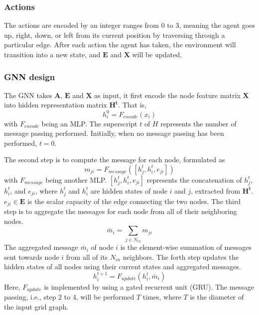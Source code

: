 \documentclass[letterpaper]{article}
\begin{document}
\subsubsection{Actions}
The actions are encoded by an integer ranges from 0 to 3, meaning the agent goes up, right, down, or left from its current position by traversing through a particular edge. After each action the agent has taken, the environment will transition into a new state, and $\mathbf{E}$ and $\mathbf{X}$ will be updated.

\subsubsection{GNN design}
The GNN takes $\mathbf{A}$, $\mathbf{E}$ and $\mathbf{X}$ as input, it first encode the node feature matrix $\mathbf{X}$ into hidden representation matrix $\mathbf{H^t}$. That is,
\begin{equation}
    h_i^0 = F_{encode}(x_i)
\end{equation}
with $F_{encode}$ being an MLP. The superscript $t$ of $H$ represents the number of message passing performed. Initially, when no message passing has been performed, $t=0$. 

The second step is to compute the message for each node, formulated as 
\begin{equation}
    m_{ji} = F_{message}([h_j^t, h_i^t, e_{ji}])
\end{equation}
with $F_{message}$ being another MLP. $[h_j^t, h_i^t, e_{ji}]$ represents the concatenation of $h_j^t$, $h_i^t$, and $e_{ji}$, where $h_j^t$ and $h_i^t$ are hidden states of node $i$ and $j$, extracted from $\mathbf{H^t}$. $e_{ji}\in \mathbf{E}$ is the scalar capacity of the edge connecting the two nodes. The third step is to aggregate the messages for each node from all of their neighboring nodes. 
\begin{equation}
    \bar{m}_{i} = \sum_{j\in N_{in}} m_{ji}
\end{equation}
The aggregated message $\bar{m}_{i}$ of node $i$ is the element-wise summation of messages sent towards node $i$ from all of its $N_{in}$ neighbors. The forth step updates the hidden states of all nodes using their current states and aggregated messages. 
\begin{equation}
    h_{i}^{t+1} = F_{update}(h_{i}^t, \bar{m}_{i})
\end{equation}
Here, $F_{update}$ is implemented by using a gated recurrent unit (GRU). The message passing, i.e., step 2 to 4, will be performed $T$ times, where $T$ is the diameter of the input grid graph. 
\end{document}
